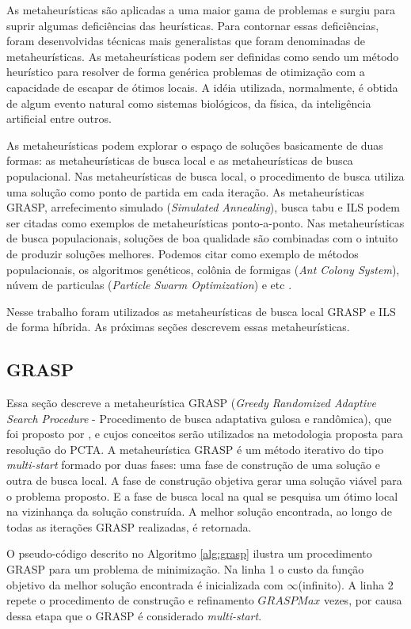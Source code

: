 As metaheurísticas são aplicadas a uma maior gama de problemas e surgiu para
suprir algumas deficiências das heurísticas. Para contornar essas deficiências,
foram desenvolvidas técnicas mais generalistas que foram denominadas de
metaheurísticas. As metaheurísticas podem ser definidas como sendo um método
heurístico para resolver de forma genérica problemas de otimização com a
capacidade de escapar de ótimos locais. A idéia utilizada, normalmente, é
obtida de algum evento natural como sistemas biológicos, da física, da
inteligência artificial entre outros.

As metaheurísticas podem explorar o espaço de soluções basicamente de duas
formas: as metaheurísticas de busca local e as metaheurísticas de busca
populacional. Nas metaheurísticas de busca local, o procedimento de busca
utiliza uma solução como ponto de partida em cada iteração. As metaheurísticas
GRASP, arrefecimento simulado (\textit{Simulated Annealing}), busca tabu e ILS
podem ser citadas como exemplos de metaheurísticas ponto-a-ponto. Nas metaheurísticas de
busca populacionais, soluções de boa qualidade são combinadas com o intuito de
produzir soluções melhores. Podemos citar como exemplo de métodos
populacionais, os algoritmos genéticos, colônia de formigas (\textit{Ant Colony
System}), núvem de particulas (\textit{Particle Swarm Optimization}) e etc
\cite{maritan2009}.

Nesse trabalho foram utilizados as metaheurísticas de busca local GRASP e ILS
de forma híbrida. As próximas seções descrevem essas metaheurísticas.

\subsection{GRASP}

Essa seção descreve a metaheurística GRASP (\textit{Greedy Randomized Adaptive
Search Procedure} - Procedimento de busca adaptativa gulosa e randômica), que
foi proposto por \cite{resende1995}, e cujos conceitos serão
utilizados na metodologia proposta para resolução do PCTA. A metaheurística
GRASP é um método iterativo do tipo \textit{multi-start} formado por duas
fases: uma fase de construção de uma solução e outra de busca local. A fase de
construção objetiva gerar uma solução viável para o problema proposto. E a fase
de busca local na qual se pesquisa  um ótimo local na vizinhança da solução
construída. A melhor solução encontrada, ao longo de todas as
iterações GRASP realizadas, é retornada.

O pseudo-código descrito no Algoritmo \ref{alg:grasp} ilustra um procedimento
GRASP para um problema de minimização. Na linha 1 o custo da função objetivo da
melhor solução encontrada é inicializada com $\infty$(infinito). A linha 2
repete o procedimento de construção e refinamento $GRASPMax$ vezes, por causa dessa
etapa que o GRASP é considerado \textit{multi-start}.

